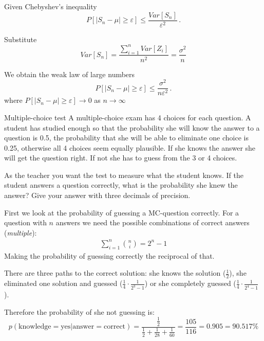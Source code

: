 \documentclass[a4paper,10pt]{article}
\begin{document}
\begin{solution}

Given Chebyshev's inequality
	\[
	P[|S_n - \mu| \geq \varepsilon] \leq \frac{Var[S_n]}{\varepsilon^2} \, .
	\]
	
Substitute $$Var[S_n]=\frac{\sum_{i=1}^n Var[Z_i]}{n^2}=\frac{\sigma^2}{n}$$

We obtain the weak law of large numbers
	\[
	P[|S_n - \mu| \geq \varepsilon] \leq \frac{\sigma^2}{n\varepsilon^2} \, .
	\]
where $P[|S_n - \mu| \geq \varepsilon] \to 0$ as $n \to \infty$
\end{solution}













\begin{nproblem}{3}{Multiple-choice test}
A multiple-choice exam has 4 choices for each question. A student has studied enough so that the probability she will know the answer to a question is 0.5, the probability that she will be able to eliminate one choice is 0.25, otherwise all 4 choices seem equally plausible. If she knows the answer she will get the question right. If not she has to guess from the 3 or 4 choices.
 
As the teacher you want the test to measure what the student knows. If the student answers a question correctly, what is the probability she knew the answer? Give your answer with three decimals of precision.


\begin{solution}
First we look at the probability of guessing a MC-question correctly. For a question with \(n\) answers we need the possible combinations of correct answers (\textit{multiple}):
\begin{align*}
    \sum_{i=1}^n {n\choose i} = 2^n - 1
\end{align*}
Making the probability of guessing correctly the reciprocal of that.

There are three paths to the correct solution: she knows the solution (\(\frac{1}{2}\)), she eliminated one solution and guessed (\(\frac{1}{4}\cdot\frac{1}{2^3 - 1}\)) or she completely guessed (\(\frac{1}{4}\cdot\frac{1}{2^4 - 1}\)).

Therefore the probability of she not guessing is:
\[
p(\text{knowledge}=\text{yes}|\text{answer}=\text{correct})
= \frac{\frac{1}{2}}{\frac{1}{2} + \frac{1}{28} + \frac{1}{60}} = \frac{105}{116} = 0.905 = 90.517\%
\]
\end{solution}
\end{nproblem}
\end{document}
